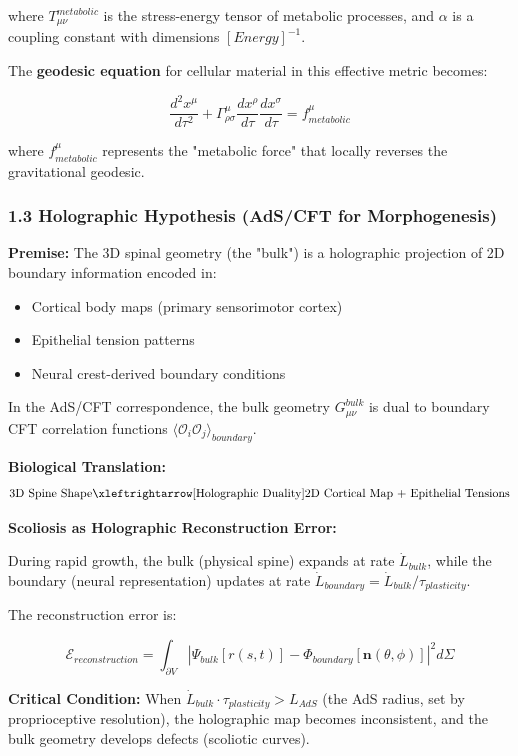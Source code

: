 \documentclass[11pt,a4paper]{article}
\begin{document}
where $T_{\mu\nu}^{metabolic}$ is the stress-energy tensor of metabolic processes, and $\alpha$ is a coupling constant with dimensions $[Energy]^{-1}$.

The \textbf{geodesic equation} for cellular material in this effective metric becomes:

$$
\frac{d^2 x^\mu}{d\tau^2} + \Gamma^\mu_{\rho\sigma} \frac{dx^\rho}{d\tau}\frac{dx^\sigma}{d\tau} = f^\mu_{metabolic}
$$

where $f^\mu_{metabolic}$ represents the "metabolic force" that locally reverses the gravitational geodesic.

\subsubsection{1.3 Holographic Hypothesis (AdS/CFT for Morphogenesis)}

\textbf{Premise:} The 3D spinal geometry (the "bulk") is a holographic projection of 2D boundary information encoded in:

\begin{itemize}
\item Cortical body maps (primary sensorimotor cortex)
\item Epithelial tension patterns
\item Neural crest-derived boundary conditions
\end{itemize}

In the AdS/CFT correspondence, the bulk geometry $G_{\mu\nu}^{bulk}$ is dual to boundary CFT correlation functions $\langle \mathcal{O}_i \mathcal{O}_j \rangle_{boundary}$.

\textbf{Biological Translation:}
$$
\text{3D Spine Shape} \xleftrightarrow[\text{Holographic Duality}]{\text{}} \text{2D Cortical Map + Epithelial Tensions}
$$

\textbf{Scoliosis as Holographic Reconstruction Error:}

During rapid growth, the bulk (physical spine) expands at rate $\dot{L}_{bulk}$, while the boundary (neural representation) updates at rate $\dot{L}_{boundary} = \dot{L}_{bulk}/\tau_{plasticity}$.

The reconstruction error is:

$$
\mathcal{E}_{reconstruction} = \int_{\partial V} \left| \Psi_{bulk}[r(s,t)] - \Phi_{boundary}[\mathbf{n}(\theta,\phi)] \right|^2 d\Sigma
$$

\textbf{Critical Condition:} When $\dot{L}_{bulk} \cdot \tau_{plasticity} > L_{AdS}$ (the AdS radius, set by proprioceptive resolution), the holographic map becomes inconsistent, and the bulk geometry develops defects (scoliotic curves).
\end{document}
